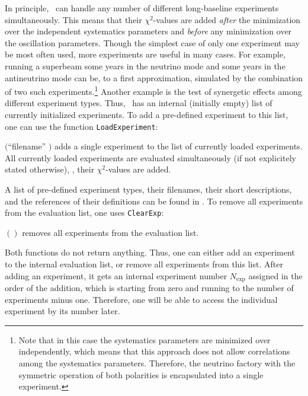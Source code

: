 In principle, \GLOBES\ can handle any number of different long-baseline experiments simultaneously. This means that their $\chi^2$-values are added {\em after} the minimization over the independent systematics parameters and {\em before} any minimization over the oscillation parameters. Though the simplest case of only one experiment may be most often used, more experiments are useful in many cases. For example, running a superbeam some years in the neutrino mode and some years in the antineutrino mode can be, to a first approximation, simulated by the combination of two such experiments.\footnote{Note that in this case the systematics parameters are minimized over independently, which means that this approach does not allow correlations among the systematics parameters. Therefore, the neutrino factory with the symmetric operation of both polarities is encapsulated into a single experiment.} Another example is the test of synergetic effects among different experiment types. Thus, \GLOBES\ has an internal (initially empty) list of currently initialized experiments. To add a pre-defined experiment to this list, one can use the function {\tt LoadExperiment}:
\begin{function}
$($``filename'' $)$ adds a single experiment to the list of currently loaded experiments. All currently loaded experiments are evaluated simultaneously (if not explicitely stated otherwise), \ie , their $\chi^2$-values are added.
\end{function}
A list of pre-defined experiment types, their filenames, their short descriptions, and the references of their definitions can be found in . To remove all experiments from the evaluation list, one uses {\tt ClearExp}:
\begin{function}
$()$ removes all experiments from the evaluation list.   
\end{function}
Both functions do not return anything. Thus, one can either add an experiment to the internal evaluation list, or remove all experiments from this list. After adding an experiment, it gets an internal experiment number $N_{\mathrm{exp}}$ assigned in the order of the addition, which is starting from zero and running to the number of experiments minus one. Therefore, one will be able to access the individual experiment by its number later.

